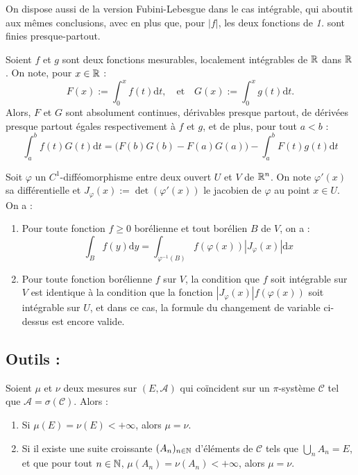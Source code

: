 \documentclass[11pt,a4paper]{article}
\begin{document}
\begin{rmq}
On dispose aussi de la version Fubini-Lebesgue dans le cas intégrable, qui aboutit aux mêmes conclusions, avec en plus que, pour $|f|$, les deux fonctions de \textit{1.} sont finies presque-partout.
\end{rmq}

\begin{cor}
Soient $f$ et $g$ sont deux fonctions mesurables, localement intégrables de $\mathbb R$ dans $\mathbb R$. On note, pour $x \in \mathbb R$ : \[ F(x) := \int_0^x f(t)\mathrm{d}t, \quad \text{et} \quad G(x) := \int_0^x g(t)\mathrm{d}t.\]
Alors, $F$ et $G$ sont absolument continues, dérivables presque partout, de dérivées presque partout égales respectivement à $f$ et $g$, et de plus, pour tout $a < b$ :
\[\int_a^b f(t)G(t)\mathrm{d}t = \Big(F(b)G(b)-F(a)G(a)\Big) - \int_a^b F(t)g(t)\mathrm{d}t\]
\end{cor}

\begin{thm}
Soit $\varphi$ un $C^1$-difféomorphisme entre deux ouvert $U$ et $V$ de $\mathbb R^n$. On note $\varphi'(x)$ sa différentielle et $J_\varphi(x):=\det\left(\varphi'(x)\right)$ le jacobien de $\varphi$ au point $x\in U$. On a :
\begin{enumerate}
\item Pour toute fonction $f\geq 0$ borélienne et tout borélien $B$ de $V$, on a : 
\[\int_B f(y)\mathrm{d}y = \int_{\varphi^{-1}(B)}f(\varphi(x)) |J_\varphi(x)|\mathrm{d}x\]
\item Pour toute fonction borélienne $f$ sur $V$, la condition que $f$ soit intégrable sur $V$ est identique à la condition que la fonction $|J_\varphi(x)|f(\varphi(x))$ soit intégrable sur $U$, et dans ce cas, la formule du changement de variable ci-dessus est encore valide.
\end{enumerate}
\end{thm}

\subsection*{Outils :}


\begin{cor} Soient $\mu$ et $\nu$ deux mesures sur $(E,\mathcal{A})$ qui coïncident sur un $\pi$-système $\mathcal{C}$ tel que $\mathcal{A}=\sigma(\mathcal{C})$. Alors :
\begin{enumerate}
\item Si $\mu(E)=\nu(E) < +\infty$, alors $\mu = \nu$.
\item Si il existe une suite croissante $(A_n)_{n\in\mathbb N}$ d'éléments de $\mathcal{C}$ tels que $\displaystyle \bigcup_n A_n = E$, et que pour tout $n\in\mathbb N$, $\mu(A_n)=\nu(A_n)<+\infty$, alors $\mu = \nu$.
\end{enumerate}
\end{cor}
\end{document}
